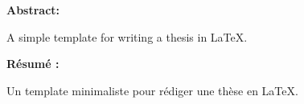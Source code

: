 \thispagestyle{empty}

\noindent \textbf{Abstract:}

\noindent A simple template for writing a thesis in \LaTeX.

\vfill

\noindent \textbf{Résumé :}

\noindent Un template minimaliste pour rédiger une thèse en \LaTeX.